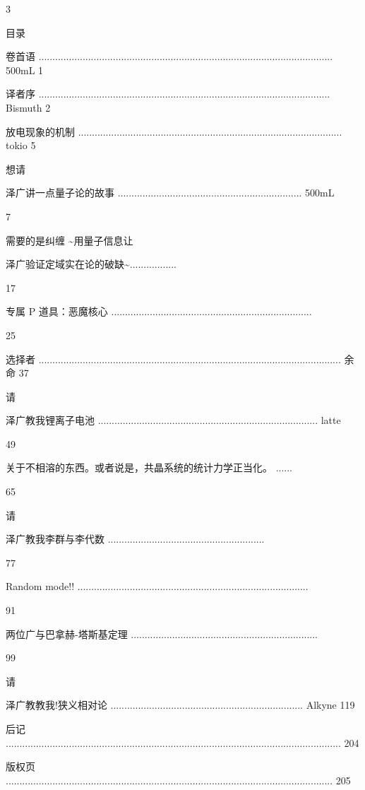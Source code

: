 3\par
目录\par
卷首语 ........................................................................................................... 500mL  1\par
译者序 .......................................................................................................... Bismuth  2\par
放电现象的机制 ................................................................................................ tokio  5\par
想请\par
泽广讲一点量子论的故事 ................................................................... 500mL\par
7\par
需要的是纠缠 \textasciitilde{}用量子信息让\par
泽广验证定域实在论的破缺\textasciitilde{}.................\par
17\par
专属 P 道具：恶魔核心 .........................................................................\par
25\par
选择者 .............................................................................................................. 余命  37\par
请\par
泽广教我锂离子电池 ................................................................................ latte\par
49\par
关于不相溶的东西。或者说是，共晶系统的统计力学正当化。 ......\par
65\par
请\par
泽广教我李群与李代数 .........................................................\par
77\par
Random mode!! ....................................................................................\par
91\par
两位广与巴拿赫-塔斯基定理 ....................................................................\par
99\par
请\par
泽广教教我!狭义相对论 ...................................................................... Alkyne  119\par
后记 .......................................................................................................................... 204\par
版权页 ....................................................................................................................... 205\par


